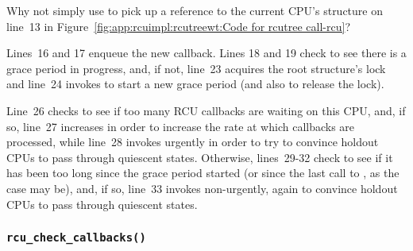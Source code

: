 \QuickQuiz{}
	Why not simply use  to pick up a
	reference to the
	current CPU's  structure on line~13 in
	Figure~\ref{fig:app:rcuimpl:rcutreewt:Code for rcutree call-rcu}?
 \QuickQuizEnd

Lines~16 and 17 enqueue the new callback.
Lines 18 and 19 check to see there is a grace period in progress,
and, if not, line~23 acquires the root  structure's
lock and line~24 invokes  to start a new grace
period (and also to release the lock).

Line~26 checks to see if too many RCU callbacks are waiting on
this CPU, and, if so, line~27 increases  in order
to increase the rate at which callbacks are processed, while
line~28 invokes  urgently in order to
try to convince holdout CPUs to pass through quiescent states.
Otherwise, lines~29-32 check to see if it has been too long since
the grace period started (or since the last call to
, as the case may be), and, if so,
line~33 invokes  non-urgently, again
to convince holdout CPUs to pass through quiescent states.

\subsubsection{\tt rcu\_check\_callbacks()}
\label{app:rcuimpl:rcutreewt:rcu-check-callbacks}

